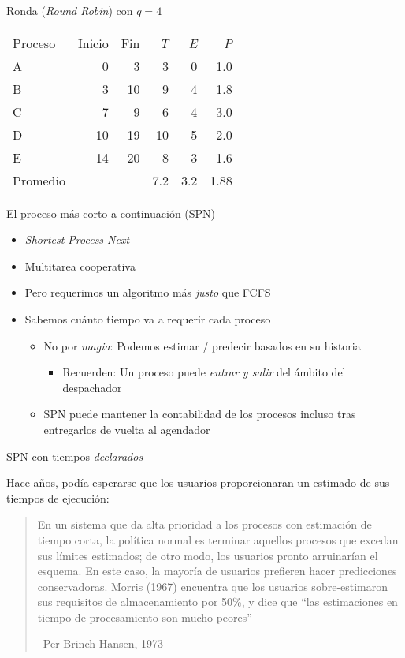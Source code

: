 \documentclass[presentation]{beamer}
\begin{document}
\begin{frame}[label={sec:org14d5a07}]{Ronda (\emph{Round Robin}) con \(q = 4\)}
\begin{center}
\begin{tabular}{lrrrrr}
Proceso & Inicio & Fin & \emph{T} & \emph{E} & \emph{P}\\
A & 0 & 3 & 3 & 0 & 1.0\\
B & 3 & 10 & 9 & 4 & 1.8\\
C & 7 & 9 & 6 & 4 & 3.0\\
D & 10 & 19 & 10 & 5 & 2.0\\
E & 14 & 20 & 8 & 3 & 1.6\\
\hline
Promedio &  &  & 7.2 & 3.2 & 1.88\\
\end{tabular}
\end{center}
\end{frame}

\begin{frame}[label={sec:org7bbbb64}]{El proceso más corto a continuación (SPN)}
\begin{itemize}
\item \emph{Shortest Process Next}
\item Multitarea cooperativa
\item Pero requerimos un algoritmo más \emph{justo} que FCFS
\item Sabemos cuánto tiempo va a requerir cada proceso
\pause
\begin{itemize}
\item No por \emph{magia}: Podemos estimar / predecir basados en su historia
\begin{itemize}
\item Recuerden: Un proceso puede \emph{entrar y salir} del ámbito del
despachador
\end{itemize}
\item SPN puede mantener la contabilidad de los procesos incluso tras
entregarlos de vuelta al agendador
\end{itemize}
\end{itemize}
\end{frame}

\begin{frame}[label={sec:orgce0d905}]{SPN con tiempos \emph{declarados}}
\begin{center}
Hace años, podía esperarse que los usuarios proporcionaran un estimado
de sus tiempos de ejecución:
\end{center}

\begin{quote}
{\small
En un sistema que da alta prioridad a los procesos con estimación de
tiempo corta, la política normal es terminar aquellos procesos que
excedan sus límites estimados; de otro modo, los usuarios pronto
arruinarían el esquema. En este caso, la mayoría de usuarios prefieren
hacer predicciones conservadoras. Morris (1967) encuentra que los
usuarios sobre-estimaron sus requisitos de almacenamiento por 50\%, y
dice que ``las estimaciones en tiempo de procesamiento son mucho
peores''

\hfill –Per Brinch Hansen, 1973
}
\end{quote}
\end{frame}
\end{document}
